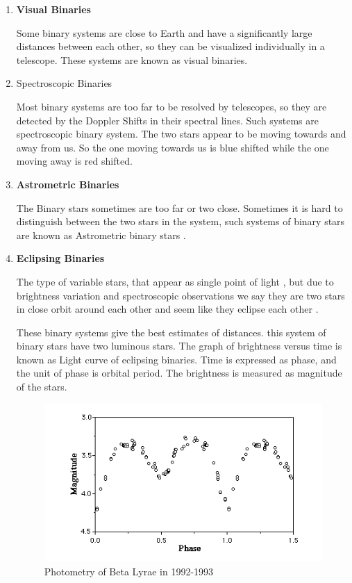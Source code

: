 \begin{enumerate}

\item\textbf{Visual Binaries}

Some binary systems are close to Earth and have a significantly large distances between each    other, so they can be visualized individually in a telescope. These systems are known as visual binaries.

\item {Spectroscopic Binaries }

Most binary systems are too far to be resolved by telescopes, so they are detected by the Doppler Shifts in their spectral lines. Such systems are spectroscopic binary system. The two stars appear to be moving towards and away from us. So the one moving towards us is blue shifted while the one moving away is red shifted.


\item \textbf{Astrometric Binaries}

The Binary stars sometimes are too far or two close. Sometimes it is hard to distinguish between the two stars in the system, such systems of binary stars are known as Astrometric binary stars \cite{astrometric_binaries}.

\item \textbf{Eclipsing Binaries}

The type of variable stars, that appear as single point of light , but due to brightness variation and spectroscopic observations we say they are two stars in close orbit around each other and seem like they eclipse each other \cite{eclipsing_binaries}.


These binary systems give the best estimates of distances. this system of binary stars have two luminous stars. The graph of brightness versus time is known as Light curve of eclipsing binaries. Time is expressed as phase, and the unit of phase is orbital period. The brightness is measured as magnitude of the stars.
\begin{figure}
\centering
\includegraphics[scale=0.5]{LC}
\caption{Photometry of Beta Lyrae in 1992-1993}
\end{figure}

\end{enumerate}

